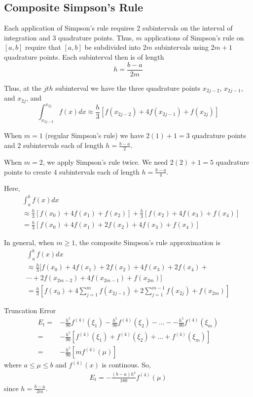 \documentclass [titlepage,12pt,letter] {article}
\begin{document}
\subsection{Composite Simpson's Rule}

Each application of Simpson's rule requires 2 subintervals on the interval of integration and 3 quadrature points. Thus, $m$ applications of Simpson's rule on $[a,b]$ require that $[a,b]$ be subdivided into $2m$ subintervals using $2m+1$ quadrature points. Each subinterval then is of length
\[
h=\frac{b-a}{2m}
\]

Thus, at the $jth$ subinterval we have the three quadrature points $x_{2j-2}$, $x_{2j-1}$, and $x_{2j}$, and
\[
\int_{x_{2j-2}}^{x_{2j}} f(x)dx \approx \frac{h}{3} \left [ f(x_{2j-2}) + 4f(x_{2j-1}) + f(x_{2j}) \right ] 
\]			     

When $m=1$ (regular Simpson's rule) we have $2(1)+1=3$ quadrature points and 2 subintervals each of length $h=\frac{b-a}{2}$.

When $m=2$, we apply Simpson's rule twice. We need $2(2)+1=5$ quadrature points to create $4$ subintervals each of length $h=\frac{b-a}{4}$.

\vspace{\baselineskip}
Here,
\begin{align*} 
& \int_{a}^{b} f(x)dx \\
& \approx \frac{h}{3} \left [ f(x_0) + 4f(x_1) + f(x_2) \right ] + \frac{h}{3} \left [ f(x_2) + 4f(x_3) + f(x_4) \right ] \\
& = \frac{h}{3} \left [ f(x_0) + 4f(x_1) + 2f(x_2) + 4f(x_3) + f(x_4) \right ]
\end{align*} 

In general, when $m \geq 1$, the composite Simpson's rule approximation is
\begin{multline*} 
 \int_{a}^{b} f(x)dx \\
 \approx \frac{h}{3}  [f(x_0) + 4f(x_1) + 2f(x_2) + 4f(x_3) + 2f(x_4) + \\ 
     \dotsm + 2f(x_{2m-2}) + 4f(x_{2m-1}) + f(x_{2m})]  \\
 = \frac{h}{3} \left [ f(x_0) + 4\sum_{j=1}^{m}f(x_{2j-1}) + 2\sum_{j=1}^{m-1}f(x_{2j}) + f(x_{2m}) \right ]
\end{multline*} 


{Truncation Error}
\begin{align*} 
E_t =& -\frac{h^5}{90} f^{(4)}(\xi_1) -\frac{h^5}{90} f^{(4)}(\xi_2) - \dots - -\frac{h^5}{90} f^{(4)}(\xi_m)  \\
=& -\frac{h^5}{90} \left [ f^{(4)}(\xi_1) + f^{(4)}(\xi_2) + \dots + f^{(4)}(\xi_m) \right ] \\
=& - \frac{h^5}{90} [ m f^{(4)}(\mu)]
\end{align*} 
where $a \leq \mu\leq b$ and $f^{(4)}(x)$ is continous. So,
\begin{align*} 
E_t = -\frac{(b-a)h^4}{180}f^{(4)}(\mu)
\end{align*} 
since $h = \frac{b-a}{2m}$. 
\end{document}
